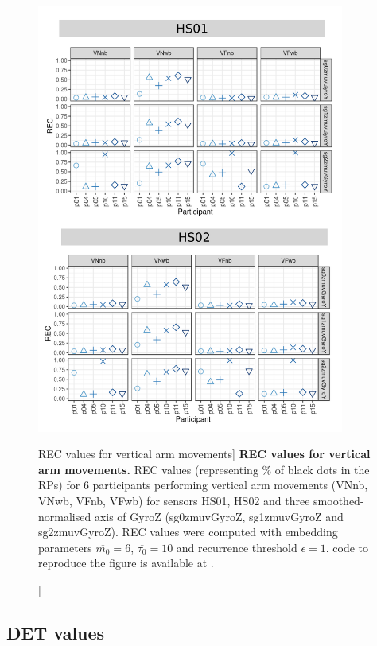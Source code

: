 \begin{figure}
\centering
\includegraphics[width=0.9\textwidth]{rqa_rec_V_w500}
    \caption
	[REC values for vertical arm movements]{
	{\bf REC values for vertical arm movements.}
	REC values (representing \% of black dots in the RPs) for 
	6 participants performing vertical arm movements 
	(VNnb, VNwb, VFnb, VFwb)
	for sensors HS01, HS02 and three smoothed-normalised axis 
	of GyroZ (sg0zmuvGyroZ, sg1zmuvGyroZ and sg2zmuvGyroZ).
	REC values were computed with 
	embedding parameters $\overline{m_0}=6$, $\overline{\tau_0}=10$ and
	recurrence threshold $\epsilon=1$.
		\R code to reproduce the figure is available at 
		.
        }
    \label{fig:rqa_rec_V}
\end{figure}


\newpage
\subsection{DET values}

